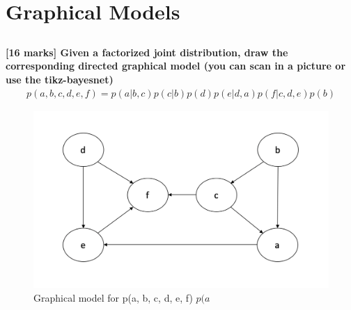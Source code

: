 \documentclass[12pt,twoside]{article}
\begin{document}
\section{Graphical Models}
\subsection{}
\textbf{[16 marks] Given a factorized joint distribution, draw the corresponding directed graphical model (you can scan in a picture or use the tikz-bayesnet)
\begin{align}
    p(a, b, c, d, e, f) = p(a|b,c)p(c|b)p(d)p(e|d,a)p(f|c,d,e)p(b)
\end{align}}

\begin{figure}[h]
\centering %
\includegraphics[width = 1\hsize]{./figures/graphical_model.pdf} %
\caption{Graphical model for p(a, b, c, d, e, f) $p(a$} %
\label{GraphicalModel}
\end{figure}
\end{document}

